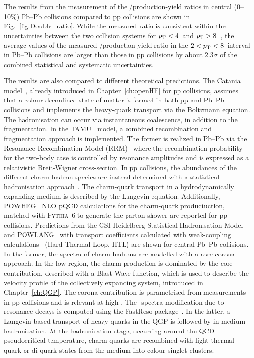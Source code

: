 The results from the measurement of the \ds/\dz production-yield ratios in central (0--10\%) Pb--Pb collisions compared to pp collisions are shown in Fig.~\ref{fig:Double_ratio}. While the measured ratio is consistent within the uncertainties between the two collision systems for $p_\mathrm{T}<4$~\gevc and $p_\mathrm{T}>8$~\gevc, the average values of the measured \ds/\dz production-yield ratio in the $2 < p_\mathrm{T} < 8$~\gevc interval in Pb--Pb collisions are larger than those in pp collisions by about $2.3\sigma$ of the combined statistical and systematic uncertainties.

The results are also compared to different theoretical predictions. The Catania model~\cite{Plumari:2017ntm,Scardina:2017ipo}, already introduced in Chapter~\ref{ch:openHF} for pp collisions, assumes that a colour-deconfined state of matter is formed in both pp and Pb--Pb collisions and implements the heavy-quark transport via the Boltzmann equation. The hadronisation can occur via instantaneous coalescence, in addition to the fragmentation. In the TAMU~\cite{He:2019vgs} model, a combined recombination and fragmentation approach is implemented. The former is realized in Pb--Pb via the Resonance Recombination Model (RRM)~\cite{Ravagli:2007xx} where the recombination probability for the two-body case is controlled by resonance amplitudes and is expressed as a relativistic Breit-Wigner cross-section. In pp collisions, the abundances of the different charm-hadron species are instead determined with a statistical hadronisation approach~\cite{He:2019tik}. The charm-quark transport in a hydrodynamically expanding medium
is described by the Langevin equation. Additionally, POWHEG~\cite{Frixione:2007nw} NLO pQCD calculations for the charm-quark productuction, matched with \textsc{Pythia}~6 to generate the parton shower are reported for pp collisions. Predictions from the GSI-Heidelberg Statistical Hadronisation Model~\cite{Andronic:2021erx} and POWLANG~\cite{Beraudo:2014boa} with transport coefficients calculated with weak-coupling calculations~\cite{Braaten:1989mz} (Hard-Thermal-Loop, HTL) are shown for central Pb--Pb collisions. In the former, the \pt spectra of charm hadrons are modelled with a core-corona approach. In the low-\pt region, the charm production is dominated by the core contribution, described with a Blast Wave function, which is used to describe the velocity profile of the collectively expanding system, introduced in Chapter~\ref{ch:QGP}. The corona contribution is parametrised from measurements in pp collisions and is relevant at high \pt. The \pt-spectra modification due to resonance decays is computed using the FastReso package~\cite{Mazeliauskas:2018irt}. In the latter, a Langevin-based transport of heavy quarks in the QGP is followed by in-medium hadronisation. At the hadronisation stage, occurring around the QCD pseudocritical temperature, charm quarks are recombined with light thermal quark or di-quark states from the medium into colour-singlet clusters.

